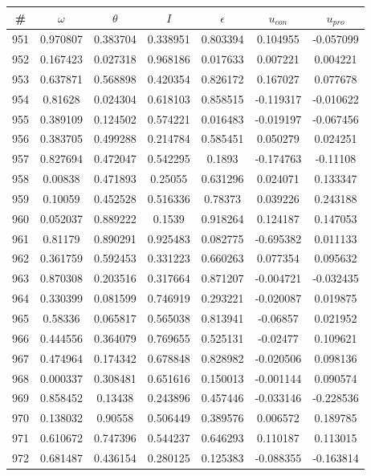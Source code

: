 \begin{table}
\begin{tabular}{c|c|c|c|c|c|c}
\# & $\omega$ & $\theta$ & $I$ & $\epsilon$ & $u_{con}$ & $u_{pro}$\\
\hline
951 & 0.970807 & 0.383704 & 0.338951 & 0.803394 & 0.104955 & -0.057099\\
952 & 0.167423 & 0.027318 & 0.968186 & 0.017633 & 0.007221 & 0.004221\\
953 & 0.637871 & 0.568898 & 0.420354 & 0.826172 & 0.167027 & 0.077678\\
954 & 0.81628 & 0.024304 & 0.618103 & 0.858515 & -0.119317 & -0.010622\\
955 & 0.389109 & 0.124502 & 0.574221 & 0.016483 & -0.019197 & -0.067456\\
956 & 0.383705 & 0.499288 & 0.214784 & 0.585451 & 0.050279 & 0.024251\\
957 & 0.827694 & 0.472047 & 0.542295 & 0.1893 & -0.174763 & -0.11108\\
958 & 0.00838 & 0.471893 & 0.25055 & 0.631296 & 0.024071 & 0.133347\\
959 & 0.10059 & 0.452528 & 0.516336 & 0.78373 & 0.039226 & 0.243188\\
960 & 0.052037 & 0.889222 & 0.1539 & 0.918264 & 0.124187 & 0.147053\\
961 & 0.81179 & 0.890291 & 0.925483 & 0.082775 & -0.695382 & 0.011133\\
962 & 0.361759 & 0.592453 & 0.331223 & 0.660263 & 0.077354 & 0.095632\\
963 & 0.870308 & 0.203516 & 0.317664 & 0.871207 & -0.004721 & -0.032435\\
964 & 0.330399 & 0.081599 & 0.746919 & 0.293221 & -0.020087 & 0.019875\\
965 & 0.58336 & 0.065817 & 0.565038 & 0.813941 & -0.06857 & 0.021952\\
966 & 0.444556 & 0.364079 & 0.769655 & 0.525131 & -0.02477 & 0.109621\\
967 & 0.474964 & 0.174342 & 0.678848 & 0.828982 & -0.020506 & 0.098136\\
968 & 0.000337 & 0.308481 & 0.651616 & 0.150013 & -0.001144 & 0.090574\\
969 & 0.858452 & 0.13438 & 0.243896 & 0.457446 & -0.033146 & -0.228536\\
970 & 0.138032 & 0.90558 & 0.506449 & 0.389576 & 0.006572 & 0.189785\\
971 & 0.610672 & 0.747396 & 0.544237 & 0.646293 & 0.110187 & 0.113015\\
972 & 0.681487 & 0.436154 & 0.280125 & 0.125383 & -0.088355 & -0.163814\\

\end{tabular}
\end{table}
